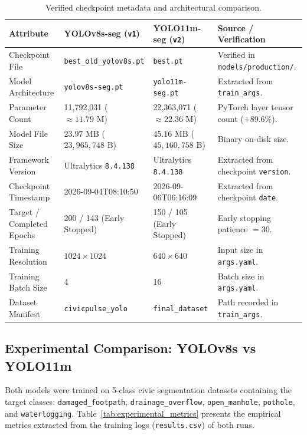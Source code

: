 \documentclass[11pt,a4paper]{article}
\begin{document}
\begin{table}[htbp]
\centering
\small
\caption{Verified checkpoint metadata and architectural comparison.}
\label{tab:checkpoint_metadata}
\begin{tabularx}{\textwidth}{l p{3.2cm} p{3.2cm} X}
\toprule
\textbf{Attribute} & \textbf{YOLOv8s-seg (\texttt{v1})} & \textbf{YOLO11m-seg (\texttt{v2})} & \textbf{Source / Verification} \\
\midrule
Checkpoint File & \texttt{best\_old\_yolov8s.pt} & \texttt{best.pt} & Verified in \texttt{models/production/}. \\
Model Architecture & \texttt{yolov8s-seg.pt} & \texttt{yolo11m-seg.pt} & Extracted from \texttt{train\_args}. \\
Parameter Count & 11,792,031 ($\approx 11.79\text{ M}$) & 22,363,071 ($\approx 22.36\text{ M}$) & PyTorch layer tensor count ($+89.6\%$). \\
Model File Size & $23.97\text{ MB}$ ($23,965,748\text{ B}$) & $45.16\text{ MB}$ ($45,160,758\text{ B}$) & Binary on-disk size. \\
Framework Version & Ultralytics \texttt{8.4.138} & Ultralytics \texttt{8.4.138} & Extracted from checkpoint \texttt{version}. \\
Checkpoint Timestamp & 2026-09-04T08:10:50 & 2026-09-06T06:16:09 & Extracted from checkpoint \texttt{date}. \\
Target / Completed Epochs & 200 / 143 (Early Stopped) & 150 / 105 (Early Stopped) & Early stopping patience $= 30$. \\
Training Resolution & $1024\times 1024$ & $640\times 640$ & Input size in \texttt{args.yaml}. \\
Training Batch Size & 4 & 16 & Batch size in \texttt{args.yaml}. \\
Dataset Manifest & \texttt{civicpulse\_yolo} & \texttt{final\_dataset} & Path recorded in \texttt{train\_args}. \\
\bottomrule
\end{tabularx}
\end{table}

\subsection{Experimental Comparison: YOLOv8s vs YOLO11m}
Both models were trained on 5-class civic segmentation datasets containing the target classes: \texttt{damaged\_footpath}, \texttt{drainage\_overflow}, \texttt{open\_manhole}, \texttt{pothole}, and \texttt{waterlogging}. Table~\ref{tab:experimental_metrics} presents the empirical metrics extracted from the training logs (\texttt{results.csv}) of both runs.
\end{document}
